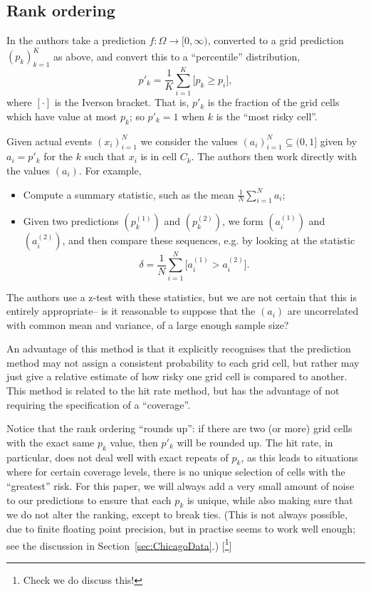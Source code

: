 \documentclass[twoside,a4paper,twocolumn,10pt]{article}
\theoremstyle{plain}
\theoremstyle{definition}
\begin{document}
\subsection{Rank ordering}\label{sec:rank_ordering}

In \cite{blx} the authors take a prediction $f:\Omega\rightarrow [0,\infty)$,
converted to a grid prediction $(p_k)_{k=1}^K$ as above, and convert this to a ``percentile''
distribution,
\[ p'_k = \frac{1}{K} \sum_{i=1}^K \big[ p_k \geq p_i \big], \]
where $[\cdot]$ is the Iverson bracket.  That is, $p'_k$ is the fraction of the grid cells
which have value at most $p_k$; so $p'_k=1$ when $k$ is the ``most risky cell''.

Given actual events $(x_i)_{i=1}^N$ we consider the values $(a_i)_{i=1}^N
\subseteq (0,1]$ given by $a_i = p'_k$ for the $k$ such that $x_i$ is in cell $C_k$.
The authors then work directly with the values $(a_i)$.  For example,
\begin{itemize}
\item Compute a summary statistic, such as the mean $\frac{1}{N} \sum_{i=1}^N a_i$;
\item Given two predictions $(p^{(1)}_k)$ and $(p^{(2)}_k)$, we form $(a^{(1)}_i)$ and 
$(a^{(2)}_i)$, and then compare these sequences, e.g. by looking at the statistic
\[ \delta = \frac{1}{N} \sum_{i=1}^N \big[ a^{(1)}_i > a^{(2)}_i \big]. \]
\end{itemize}
The authors use a z-test with these statistics, but we are not certain that this is
entirely appropriate-- is it reasonable to suppose that the $(a_i)$ are uncorrelated with
common mean and variance, of a large enough sample size?

An advantage of this method is that it explicitly recognises that the prediction method may
not assign a consistent probability to each grid cell, but rather may just give a relative
estimate of how risky one grid cell is compared to another.  This method is related to the
hit rate method, but has the advantage of not requiring the specification of a ``coverage''.

Notice that the rank ordering ``rounds up'': if there are two (or more) grid cells with
the exact same $p_k$ value, then $p'_k$ will be rounded up.  The hit rate, in particular,
does not deal well with exact repeats of $p_k$, as this leads to situations where for certain
coverage levels, there is no unique selection of cells with the ``greatest'' risk.
For this paper, we will always add a very small amount of noise to our predictions to ensure
that each $p_k$ is unique, while also making sure that we do not alter the ranking, except
to break ties.  (This is not always possible, due to finite floating point precision, but in
practise seems to work well enough; see the discussion in Section~\ref{sec:ChicagoData}.)
[\footnote{Check we do discuss this!}]
\end{document}
